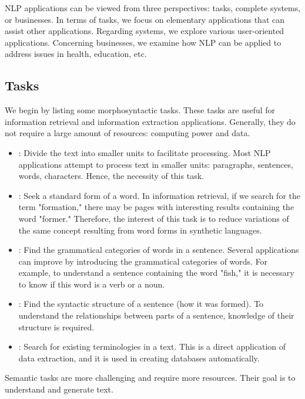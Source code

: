 \documentclass{KBook}
\begin{document}
NLP applications can be viewed from three perspectives: tasks, complete systems, or businesses. In terms of tasks, we focus on elementary applications that can assist other applications. Regarding systems, we explore various user-oriented applications. Concerning businesses, we examine how NLP can be applied to address issues in health, education, etc.

\subsection{Tasks}

We begin by listing some morphosyntactic tasks. These tasks are useful for information retrieval and information extraction applications. Generally, they do not require a large amount of resources: computing power and data.

\begin{itemize}
	\item {}: Divide the text into smaller units to facilitate processing. Most NLP applications attempt to process text in smaller units: paragraphs, sentences, words, characters. Hence, the necessity of this task.
	\item {}: Seek a standard form of a word. In information retrieval, if we search for the term "formation," there may be pages with interesting results containing the word "former." Therefore, the interest of this task is to reduce variations of the same concept resulting from word forms in synthetic languages.
	\item {}: Find the grammatical categories of words in a sentence. Several applications can improve by introducing the grammatical categories of words. For example, to understand a sentence containing the word "fish," it is necessary to know if this word is a verb or a noun.
	\item {}: Find the syntactic structure of a sentence (how it was formed). To understand the relationships between parts of a sentence, knowledge of their structure is required.
	\item {}: Search for existing terminologies in a text. This is a direct application of data extraction, and it is used in creating databases automatically.
\end{itemize}

Semantic tasks are more challenging and require more resources. Their goal is to understand and generate text.
\end{document}
